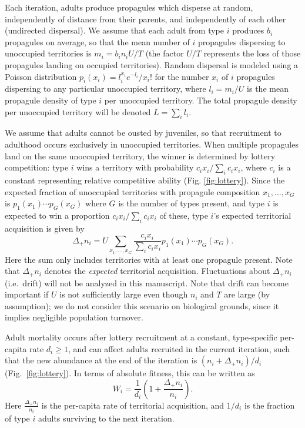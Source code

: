 \documentclass[12pt]{article}
\begin{document}
Each iteration, adults produce propagules which disperse at random, independently of distance from their parents, and independently of each other (undirected dispersal). We assume that each adult from type $i$ produces $b_i$ propagules on average, so that the mean number of $i$ propagules dispersing to unoccupied territories is $m_i=b_in_iU/T$ (the factor $U/T$ represents the loss of those propagules landing on occupied territories). Random dispersal is modeled using a Poisson distribution $p_i(x_i)=l_i^{x_i} e^{-l_i}/x_i!$ for the number $x_i$ of $i$ propagules dispersing to any particular unoccupied territory, where $l_i=m_i/U$ is the mean propagule density of type $i$ per unoccupied territory. The total propagule density per unoccupied territory will be denoted $L=\sum_i l_i$.

We assume that adults cannot be ousted by juveniles, so that recruitment to adulthood occurs exclusively in unoccupied territories. When multiple propagules land on the same unoccupied territory, the winner is determined by lottery competition: type $i$ wins a territory with probability $c_i x_i/\sum_i c_i x_i$, where $c_i$ is a constant representing relative competitive ability (Fig. \ref{fig:lottery}). Since the expected fraction of unoccupied territories with propagule composition $x_1,\ldots,x_G$ is $p_1(x_1)\cdots p_G(x_G)$ where $G$ is the number of types present, and type $i$ is expected to win a proportion $c_i x_i/\sum_i c_i x_i$ of these, type $i$'s expected territorial acquisition is given by
\begin{equation}
\Delta_+ n_i=U\sum_{x_1,\ldots,x_G} \frac{c_i x_i}{\sum_i c_i x_i} p_1(x_1)\cdots p_G(x_G). \label{eq:growthsumuncoupled}
\end{equation}
Here the sum only includes territories with at least one propagule present. Note that $\Delta_+ n_i$ denotes the \textit{expected} territorial acquisition. Fluctuations about $\Delta_+ n_i$ (i.e.~drift) will not be analyzed in this manuscript. Note that drift can become important if $U$ is not sufficiently large even though $n_i$ and $T$ are large (by assumption); we do not consider this scenario on biological grounds, since it implies negligible population turnover.

Adult mortality occurs after lottery recruitment at a constant, type-specific per-capita rate $d_i\geq 1$, and can affect adults recruited in the current iteration, such that the new abundance at the end of the iteration is $(n_i+\Delta_+ n_i)/d_i$ (Fig.~\ref{fig:lottery}). In terms of absolute fitness, this can be written as
\begin{equation}
W_i=\frac{1}{d_i}\left(1+\frac{\Delta_+ n_i}{n_i}\right). \label{eq:absfit}
\end{equation}
Here $\frac{\Delta_+ n_i}{n_i}$ is the per-capita rate of territorial acquisition, and $1/d_i$ is the fraction of type $i$ adults surviving to the next iteration.
\end{document}
